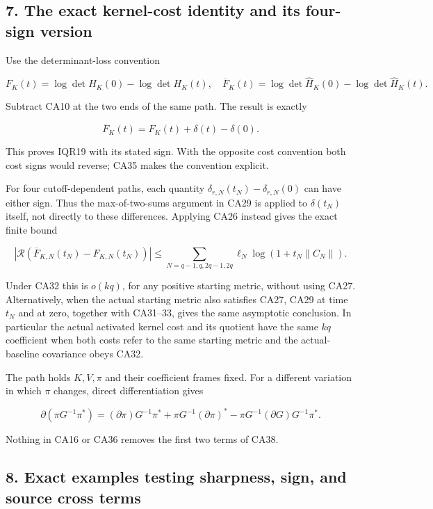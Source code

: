 \subsection{7. The exact kernel-cost identity and its four-sign version}\label{the-exact-kernel-cost-identity-and-its-four-sign-version}

Use the determinant-loss convention

\[
F_K(t)=\log\det H_K(0)-\log\det H_K(t),
\quad
\overline F_K(t)=\log\det\widehat H_K(0)
-\log\det\widehat H_K(t).
\tag{CA35}
\]

Subtract CA10 at the two ends of the same path. The result is exactly

\[
\boxed{\overline F_K(t)=F_K(t)+\delta(t)-\delta(0).}
\tag{CA36}
\]

This proves IQR19 with its stated sign. With the opposite cost convention both cost signs would reverse; CA35 makes the convention explicit.

For four cutoff-dependent paths, each quantity \(\delta_{r,N}(t_N)-\delta_{r,N}(0)\) can have either sign. Thus the max-of-two-sums argument in CA29 is applied to \(\delta(t_N)\) itself, not directly to these differences. Applying CA26 instead gives the exact finite bound

\[
\left|\mathcal R(\overline F_{K,N}(t_N)-F_{K,N}(t_N))\right|
\le\sum_{N=q-1,q,2q-1,2q}
\ell_N\log(1+t_N\|C_N\|).
\tag{CA37}
\]

Under CA32 this is \(o(kq)\), for any positive starting metric, without using CA27. Alternatively, when the actual starting metric also satisfies CA27, CA29 at time \(t_N\) and at zero, together with CA31--33, gives the same asymptotic conclusion. In particular the actual activated kernel cost and its quotient have the same \(kq\) coefficient when both costs refer to the same starting metric and the actual-baseline covariance obeys CA32.

The path holds \(K,V,\pi\) and their coefficient frames fixed. For a different variation in which \(\pi\) changes, direct differentiation gives

\[
\partial(\pi G^{-1}\pi^*)
=(\partial\pi)G^{-1}\pi^*
+\pi G^{-1}(\partial\pi)^*
-\pi G^{-1}(\partial G)G^{-1}\pi^*.
\tag{CA38}
\]

Nothing in CA16 or CA36 removes the first two terms of CA38.

\subsection{8. Exact examples testing sharpness, sign, and source cross terms}\label{exact-examples-testing-sharpness-sign-and-source-cross-terms}

